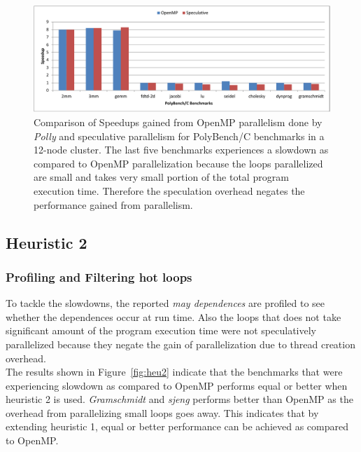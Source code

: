 \documentclass[10pt]{report}          %
\begin{document}
\begin{figure}[h]
\centering
\includegraphics[scale = 0.75]{./pdf/openmp_vs_spec_poly}
\caption{Comparison of Speedups gained from OpenMP parallelism done by \textit{Polly} and speculative parallelism for PolyBench/C benchmarks in a 12-node cluster. The last five benchmarks experiences a slowdown as compared to OpenMP parallelization because the loops parallelized are small and takes very small portion of the total program execution time.  Therefore the speculation overhead negates the performance gained from parallelism.}
\label{fig:openmp_vs_spec_poly}
\end{figure}

\subsection{Heuristic 2}

\subsubsection{Profiling and Filtering hot loops}

To tackle the slowdowns, the reported \textit{may dependences} are profiled to see whether the dependences occur at run time. Also the loops that does not take significant amount of the program execution time were not speculatively parallelized because they negate the gain of parallelization due to thread creation overhead. \\
The results shown in Figure~\ref{fig:heu2} indicate that the benchmarks that were experiencing slowdown as compared to OpenMP performs equal or better  when heuristic 2 is used. \textit{Gramschmidt} and \textit{sjeng} performs better than OpenMP as the overhead from parallelizing small loops goes away.  This indicates that by extending heuristic 1, equal or better performance can be achieved as compared to OpenMP.
\end{document}
